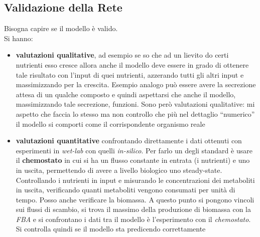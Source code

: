 \documentclass[a4paper,12pt, oneside]{book}
\begin{document}
\subsection{Validazione della Rete}
Bisogna capire se il modello è valido.\\
Si hanno:
\begin{itemize}
  \item \textbf{valutazioni qualitative}, ad esempio se so che ad un lievito do
  certi nutrienti esso cresce allora anche il modello deve essere in grado di
  ottenere tale risultato con l'input di quei nutrienti, azzerando tutti gli
  altri input e massimizzando per la crescita. Esempio analogo può essere avere
  la secrezione attesa di un qualche composto e quindi aspettarsi che anche il
  modello, massimizzando tale secrezione, funzioni. Sono però valutazioni
  qualitative: mi aspetto che faccia lo stesso ma non controllo che più nel
  dettaglio ``numerico'' il modello si comporti come il corrispondente organismo
  reale 
  \item\textbf{valutazioni quantitative} confrontando direttamente i dati
  ottenuti con esperimenti in \textit{wet-lab} con quelli
  \textit{in-silico}. Per farlo un degli standard è usare il
  \textbf{chemostato} in cui si ha un flusso constante in entrata (i nutrienti)
  e uno in 
  uscita, permettendo di avere a livello biologico uno
  steady-state. Controllando i nutrienti in input e misurando le concentrazioni
  dei metaboliti in uscita, verificando quanti metaboliti vengono consumati per
  unità di tempo. Posso anche verificare la biomassa. A questo punto si pongono
  vincoli sui flussi di scambio, si trova il massimo della produzione di
  biomassa con la \textit{FBA} e si confrontano i dati tra il modello è
  l'esperimento con il \textit{chemostato}. Si controlla quindi se il modello
  sta predicendo correttamente
\end{itemize}
\end{document}
